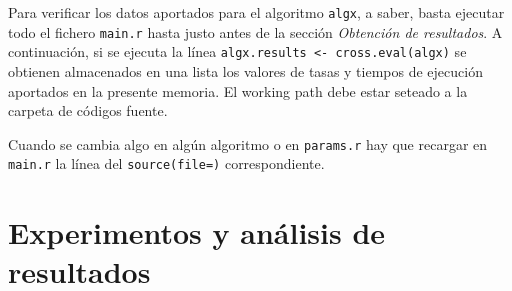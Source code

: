 \documentclass[a4paper,11pt]{article}
\begin{document}
 Para verificar los datos aportados para el algoritmo \texttt{algx}, a saber, basta ejecutar todo el fichero \texttt{main.r}
 hasta justo antes de la sección \textit{Obtención de resultados}. A continuación, si se ejecuta la línea 
 \texttt{algx.results <- cross.eval(algx)} se obtienen almacenados en una lista los valores de tasas y tiempos de ejecución
 aportados en la presente memoria. El working path debe estar seteado a la carpeta de códigos fuente.
 
 Cuando se cambia algo en algún algoritmo o en \texttt{params.r} hay que recargar en \texttt{main.r}
 la línea del \texttt{source(file=)} correspondiente.
 
 \section{Experimentos y análisis de resultados}
\end{document}
